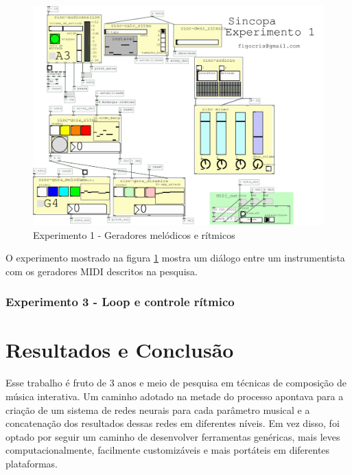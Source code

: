 \documentclass{ppgmus}
\begin{document}
\begin{figure}[-h]
\includegraphics[scale=.4]{experimento1}
\caption{Experimento 1 - Geradores melódicos e rítmicos}
\label{experimento1}
\end{figure}


O experimento mostrado na figura \ref{experimento1} mostra um diálogo
entre um instrumentista com os geradores MIDI descritos na pesquisa.




\subsection{Experimento 3 - Loop e controle rítmico}










\chapter{Resultados e Conclusão}
\label{sec:conclusao}


Esse trabalho é fruto de 3 anos e meio de pesquisa em técnicas
de composição de música interativa. Um caminho adotado na metade do
processo apontava para a criação de um sistema de redes neurais 
para cada parâmetro musical e a concatenação dos resultados dessas redes
em diferentes níveis. Em vez disso, foi optado por seguir um caminho
de desenvolver ferramentas genéricas, mais leves computacionalmente,
facilmente customizáveis e mais portáteis em diferentes plataformas.
\end{document}
